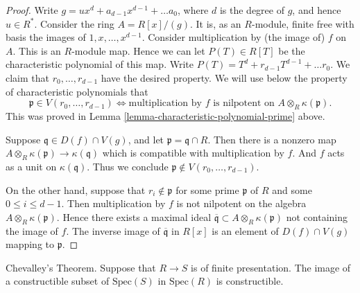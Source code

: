 \begin{proof}
Write $g = ux^d + a_{d-1}x^{d-1} + \ldots a_0$, where
$d$ is the degree of $g$, and hence $u \in R^*$.
Consider the ring $A = R[x]/(g)$.
It is, as an $R$-module, finite free with basis the images
of $1,x,\ldots,x^{d-1}$. Consider multiplication
by (the image of) $f$ on $A$. This is an $R$-module map.
Hence we can let $P(T) \in R[T]$ be the characteristic polynomial
of this map. Write $P(T) = T^d + r_{d-1} T^{d-1} + \ldots r_0$.
We claim that $r_0, \ldots, r_{d-1}$ have the desired property.
We will use below the property of characteristic polynomials 
that
$$
\mathfrak p \in V(r_0, \ldots, r_{d-1})
\Leftrightarrow
\text{multiplication by }f\text{ is nilpotent on }
A\otimes_R \kappa(\mathfrak p).
$$
This was proved in Lemma \ref{lemma-characteristic-polynomial-prime} above.

\medskip\noindent
Suppose $\mathfrak q\in D(f) \cap V(g)$, and let
$\mathfrak p = \mathfrak q \cap R$. Then there is a nonzero map
$A\otimes_R \kappa(\mathfrak p) \to \kappa(\mathfrak q)$ which
is compatible with multiplication by $f$.
And $f$ acts as a unit on $\kappa(\mathfrak q)$. 
Thus we conclude $\mathfrak p \not \in  V(r_0, \ldots, r_{d-1})$.

\medskip\noindent
On the other hand, suppose that $r_i \not\in \mathfrak p$ for some
prime $\mathfrak p$ of $R$ and some $0 \leq i \leq d - 1$.
Then multiplication by $f$ is not nilpotent on the algebra
$A \otimes_R \kappa(\mathfrak p)$.
Hence there exists a maximal ideal $\overline{\mathfrak q} \subset
A \otimes_R \kappa(\mathfrak p)$ not containing the image of $f$.
The inverse image of $\overline{\mathfrak q}$ in $R[x]$ 
is an element of $D(f) \cap V(g)$ mapping to $\mathfrak p$.
\end{proof}

\begin{theorem}
\label{theorem-chevalley}
Chevalley's Theorem.
Suppose that $R \to S$ is of finite presentation.
The image of a constructible subset of
$\text{Spec}(S)$ in $\text{Spec}(R)$ is constructible.
\end{theorem}

